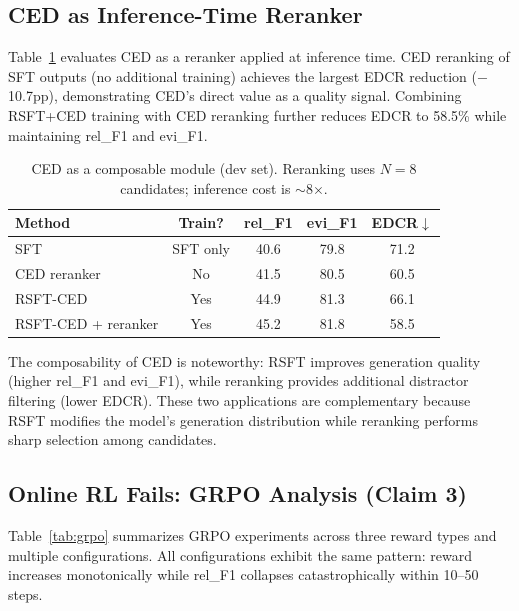\documentclass[11pt,a4paper]{article}
\begin{document}
\subsection{CED as Inference-Time Reranker}

Table~\ref{tab:reranker} evaluates CED as a reranker applied at inference time. CED reranking of SFT outputs (no additional training) achieves the largest EDCR reduction ($-$10.7pp), demonstrating CED's direct value as a quality signal. Combining RSFT+CED training with CED reranking further reduces EDCR to 58.5\% while maintaining rel\_F1 and evi\_F1.

\begin{table}[t]
\centering
\small
\begin{tabular}{lcccc}
\toprule
\textbf{Method} & \textbf{Train?} & \textbf{rel\_F1} & \textbf{evi\_F1} & \textbf{EDCR}$\downarrow$ \\
\midrule
SFT & SFT only & 40.6 & 79.8 & 71.2 \\
CED reranker & No & 41.5 & 80.5 & 60.5 \\
RSFT-CED & Yes & 44.9 & 81.3 & 66.1 \\
RSFT-CED + reranker & Yes & 45.2 & 81.8 & 58.5 \\
\bottomrule
\end{tabular}
\caption{CED as a composable module (dev set). Reranking uses $N{=}8$ candidates; inference cost is $\sim$8$\times$.}
\label{tab:reranker}
\end{table}

The composability of CED is noteworthy: RSFT improves generation quality (higher rel\_F1 and evi\_F1), while reranking provides additional distractor filtering (lower EDCR). These two applications are complementary because RSFT modifies the model's generation distribution while reranking performs sharp selection among candidates.

\subsection{Online RL Fails: GRPO Analysis (Claim 3)}
\label{sec:grpo}

Table~\ref{tab:grpo} summarizes GRPO experiments across three reward types and multiple configurations. All configurations exhibit the same pattern: reward increases monotonically while rel\_F1 collapses catastrophically within 10--50 steps.
\end{document}

